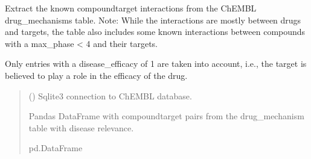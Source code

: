 \documentclass[letterpaper,10pt,english]{sphinxmanual}
\begin{document}
\begin{fulllineitems}
\label{\detokenize{get_drug_mechanism_ct_pairs:get_drug_mechanism_ct_pairs.get_drug_mechanisms_interactions}}
\pysigstartsignatures
{}
\pysigstopsignatures
\sphinxAtStartPar
Extract the known compound\sphinxhyphen{}target interactions from the ChEMBL drug\_mechanisms table.
Note: While the interactions are mostly between drugs and targets,
the table also includes some known interactions between
compounds with a max\_phase \textless{} 4 and their targets.

\sphinxAtStartPar
Only entries with a disease\_efficacy of 1 are taken into account,
i.e., the target is believed to play a role in the efficacy of the drug.

\sphinxAtStartPar
{}
\begin{quote}\begin{description}
\sphinxAtStartPar
{} () \textendash{} Sqlite3 connection to ChEMBL database.

\sphinxAtStartPar
Pandas DataFrame with compound\sphinxhyphen{}target pairs
from the drug\_mechanism table with disease relevance.

\sphinxAtStartPar
pd.DataFrame

\end{description}\end{quote}

\end{fulllineitems}

\end{document}
